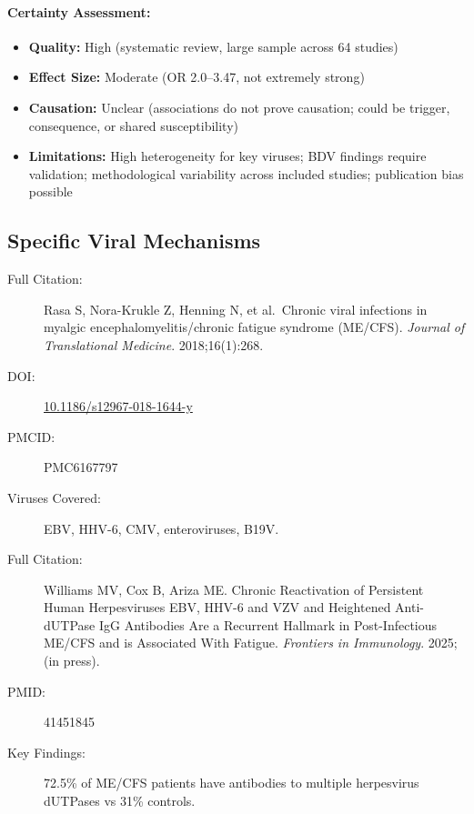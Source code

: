 \paragraph{Certainty Assessment:}
\begin{itemize}
    \item \textbf{Quality:} High (systematic review, large sample across 64 studies)
    \item \textbf{Effect Size:} Moderate (OR 2.0--3.47, not extremely strong)
    \item \textbf{Causation:} Unclear (associations do not prove causation; could be trigger, consequence, or shared susceptibility)
    \item \textbf{Limitations:} High heterogeneity for key viruses; BDV findings require validation; methodological variability across included studies; publication bias possible
\end{itemize}

\subsection{Specific Viral Mechanisms}

\begin{description}
    \item[Full Citation:] Rasa S, Nora-Krukle Z, Henning N, et al.\ Chronic viral infections in myalgic encephalomyelitis/chronic fatigue syndrome (ME/CFS). \textit{Journal of Translational Medicine}. 2018;16(1):268.
    \item[DOI:] \href{https://doi.org/10.1186/s12967-018-1644-y}{10.1186/s12967-018-1644-y}
    \item[PMCID:] PMC6167797
    \item[Viruses Covered:] EBV, HHV-6, CMV, enteroviruses, B19V.
\end{description}

\begin{description}
    \item[Full Citation:] Williams MV, Cox B, Ariza ME. Chronic Reactivation of Persistent Human Herpesviruses EBV, HHV-6 and VZV and Heightened Anti-dUTPase IgG Antibodies Are a Recurrent Hallmark in Post-Infectious ME/CFS and is Associated With Fatigue. \textit{Frontiers in Immunology}. 2025;(in press).
    \item[PMID:] 41451845
    \item[Key Findings:] 72.5\% of ME/CFS patients have antibodies to multiple herpesvirus dUTPases vs 31\% controls.
\end{description}

